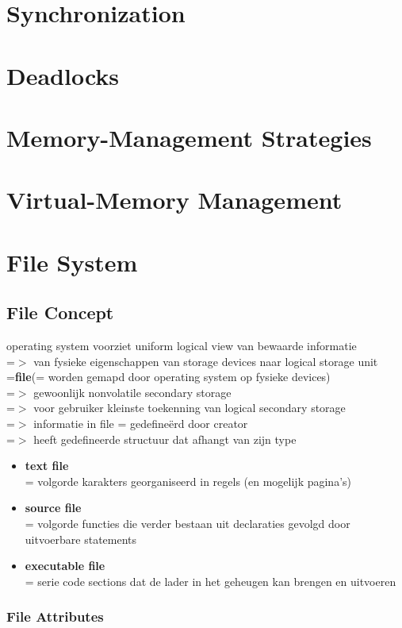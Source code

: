 \documentclass{report}
\begin{document}
\chapter{Synchronization}
\chapter{Deadlocks}
\chapter{Memory-Management Strategies}
\chapter{Virtual-Memory Management}
\chapter{File System}
\section{File Concept}
operating system voorziet uniform logical view van bewaarde informatie
\\=$>$ van fysieke eigenschappen van storage devices naar logical storage unit =\textbf{file}(= worden gemapd door operating system op fysieke devices)
\\=$>$ gewoonlijk nonvolatile secondary storage
\\=$>$ voor gebruiker kleinste toekenning van logical secondary storage
\\=$>$ informatie in file = gedefine\"erd door creator
\\=$>$ heeft gedefineerde structuur dat afhangt van zijn type
\begin{itemize}
\item \textbf{text file}
\\= volgorde karakters georganiseerd in regels (en mogelijk pagina's)
\item \textbf{source file}
\\= volgorde functies die verder bestaan uit declaraties gevolgd door uitvoerbare statements
\item \textbf{executable file}
\\= serie code sections dat de lader in het geheugen kan brengen en uitvoeren
\end{itemize}
\subsection{File Attributes}
\end{document}
